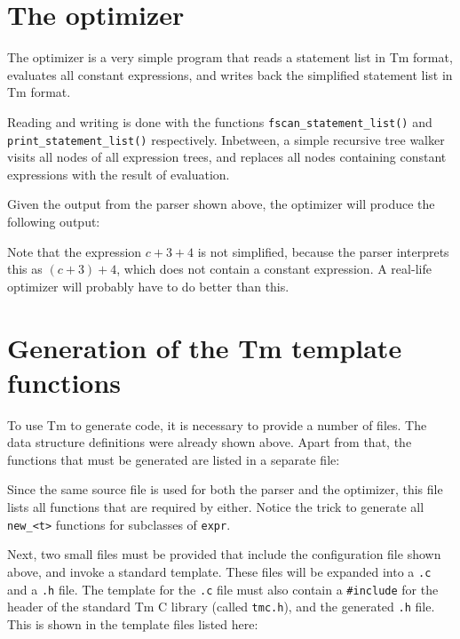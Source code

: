 \section{The optimizer}
The optimizer is a very simple program that reads a statement list
in Tm format, evaluates all constant expressions, and writes back the
simplified statement list in Tm format.
\begin{showfile}
\end{showfile}
\begin{sloppypar}
Reading and writing is done with the functions
\verb'fscan_statement_list()' and \verb'print_statement_list()'
respectively. Inbetween, a simple recursive tree walker visits all nodes
of all expression trees, and replaces all nodes containing constant
expressions with the result of evaluation.
\end{sloppypar}

Given the output from the parser shown above, the optimizer will produce
the following output:
\begin{showfile}
\end{showfile}
Note that the expression $c+3+4$ is not simplified, because the parser
interprets this as $(c+3)+4$, which does not contain a constant
expression. A real-life optimizer will probably have to do better
than this.
\section{Generation of the Tm template functions}
To use Tm to generate code, it is necessary to provide a
number of files. The data structure definitions were already shown above.
Apart from that, the functions that must be generated are listed in a
separate file:
\begin{showfile}
\end{showfile}
Since the same source file is used for both the parser and the
optimizer, this file lists all functions that are required by either.
Notice the trick to generate all \verb'new_<t>' functions for subclasses
of {\tt expr}.

Next, two small files must be provided that include the configuration
file shown above, and invoke a standard template. These files will be
expanded into a \verb'.c' and a \verb'.h' file. The template for the
\verb'.c' file must also contain a \verb'#include' for the header of the
standard Tm C library (called \verb'tmc.h'), and the generated \verb'.h'
file. This is shown in the template files listed here:

